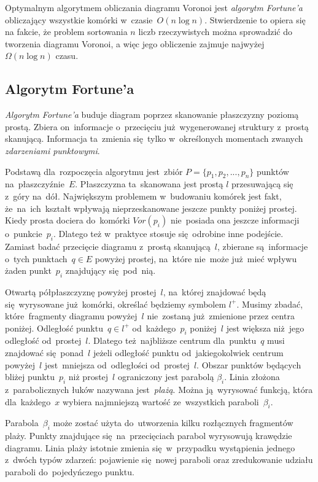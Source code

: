 \documentclass[skorowidz,autorrok,backref,xodstep,oswiadczenie]{wmimgr}
\begin{document}
Optymalnym algorytmem obliczania diagramu Voronoi jest \emph{algorytm Fortune'a} obliczający wszystkie komórki w~czasie~$O(n \log{n})$. Stwierdzenie to opiera się na fakcie, że problem sortowania $n$ liczb rzeczywistych można sprowadzić do tworzenia diagramu Voronoi, a więc jego obliczenie zajmuje najwyżej $\Omega(n \log{n})$ czasu.

\subsection{Algorytm Fortune'a}

\emph{Algorytm Fortune'a} buduje diagram poprzez skanowanie płaszczyzny poziomą prostą. Zbiera on~informacje o~przecięciu już~wygenerowanej struktury z~prostą skanującą. Informacja ta~zmienia się~tylko w~określonych momentach zwanych \emph{zdarzeniami punktowymi}.

Podstawą dla~rozpoczęcia algorytmu jest~zbiór $P = \{p_{1},p_{2},...,p_{n}\}$ punktów na~płaszczyźnie~$E$. Płaszczyzna ta~skanowana jest prostą $l$ przesuwającą się z~góry na~dół. Największym problemem w~budowaniu komórek jest fakt, że~na~ich~kształt wpływają nieprzeskanowane jeszcze punkty poniżej prostej. Kiedy prosta dociera do~komórki $Vor(p_{i})$ nie~posiada ona jeszcze informacji o~punkcie~$p_{i}$. Dlatego też w~praktyce stosuje się~odrobine inne podejście. Zamiast badać przecięcie diagramu z~prostą skanującą~$l$, zbierane są~informacje o~tych punktach~$q \in E$ powyżej prostej, na~które nie~może już~mieć wpływu żaden punkt~$p_{i}$ znajdujący się~pod~nią.

Otwartą półpłaszczyznę powyżej prostej~$l$, na~której znajdować będą się~wyrysowane już~komórki, określać będziemy symbolem $l^{+}$. Musimy zbadać, które~fragmenty diagramu powyżej~$l$ nie~zostaną już~zmienione przez centra poniżej. Odległość punktu~$q \in l^{+}$ od~każdego~$p_{i}$ poniżej~$l$ jest większa niż~jego odległość od~prostej~$l$. Dlatego też~najbliższe centrum dla~punktu~$q$ musi znajdować się~ponad~$l$ jeżeli odległość punktu od~jakiegokolwiek centrum powyżej~$l$ jest~mniejsza od~odległości od~prostej~$l$. Obszar punktów będących bliżej punktu~$p_{i}$ niż prostej~$l$ ograniczony jest parabolą $\beta_{i}$. Linia złożona z~parabolicznych łuków nazywana jest~\emph{plażą}. Można ją~wyrysować funkcją, która dla~każdego~$x$ wybiera najmniejszą wartość ze~wszystkich paraboli~$\beta_{i}$.

Parabola~$\beta_{i}$ może zostać użyta do~utworzenia kilku rozłącznych fragmentów plaży. Punkty znajdujące się~na~przecięciach parabol wyrysowują krawędzie diagramu. Linia plaży istotnie zmienia się~w~przypadku wystąpienia jednego z~dwóch typów zdarzeń: pojawienie się~nowej paraboli oraz zredukowanie udziału paraboli do~pojedyńczego punktu.
\end{document}
